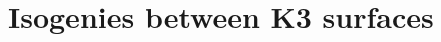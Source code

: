 \documentclass{article}
\def\P{\mathbf{P}}
\begin{document}
%
%
%
%



\section{Isogenies between K3 surfaces}
\end{document}
